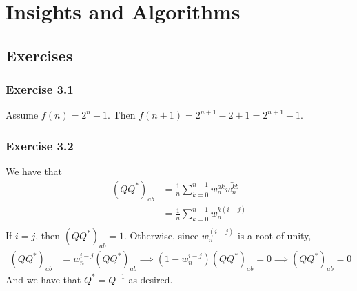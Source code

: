 \section{Insights and Algorithms}

\subsection{Exercises}

\subsubsection{Exercise 3.1}
Assume $f(n) = 2^{n} - 1$. Then $f(n + 1) = 2^{n + 1} - 2 + 1 = 2^{n + 1} - 1$.

\subsubsection{Exercise 3.2}
We have that
\begin{align*}
        (QQ^* )_{ab} &= \frac{1}{n}\sum_{k = 0}^{n - 1} w_n^{ak} \bar{w_n^{kb}} \\
                     &= \frac{1}{n}\sum_{k = 0}^{n - 1} w_n^{k(i - j)}\\
\end{align*}
If $i = j$, then $(QQ^*)_{ab} = 1$. Otherwise, since $w_n^{(i - j)}$ is a root of unity,
\begin{align*}
        (QQ^*)_{ab} &= w_n^{i - j} (QQ^*)_{ab} \implies (1 - w_n^{i - j}) (QQ^*)_{ab} = 0 \implies
        (QQ^*)_{ab} = 0
\end{align*}
And we have that $Q^* = Q^{-1}$ as desired.
